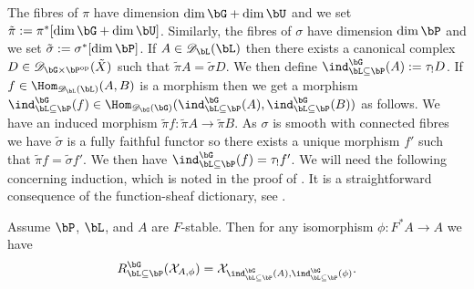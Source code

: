 \documentclass[eqthmnum,nocolour,skinny]{jt-calcs}
\begin{document}
\begin{pa}
The fibres of $\pi$ have dimension $\dim\bG+\dim\bU$ and we set $\tilde{\pi} := \pi^*[\dim\bG+\dim\bU]$. Similarly, the fibres of $\sigma$ have dimension $\dim\bP$ and we set $\tilde{\sigma} := \sigma^*[\dim\bP]$. If $A \in \mathscr{D}_{\bL}(\bL)$ then there exists a canonical complex $D \in \mathscr{D}_{\bG\times\bP^{\mathrm{op}}}(\tilde{X})$ such that $\tilde{\pi}A = \tilde{\sigma}D$. We then define $\ind_{\bL\subseteq\bP}^{\bG}(A) := \tau_!D$. If $f \in \Hom_{\mathscr{D}_{\bL}(\bL)}(A,B)$ is a morphism then we get a morphism $\ind_{\bL\subseteq\bP}^{\bG}(f) \in \Hom_{\mathscr{D}_{\bG}(\bG)}(\ind_{\bL\subseteq\bP}^{\bG}(A),\ind_{\bL\subseteq\bP}^{\bG}(B))$ as follows. We have an induced morphism $\tilde{\pi}f : \tilde{\pi}A \to \tilde{\pi}B$. As $\sigma$ is smooth with connected fibres we have $\widetilde{\sigma}$ is a fully faithful functor so there exists a unique morphism $f'$ such that $\widetilde{\pi}f = \widetilde{\sigma}f'$. We then have $\ind_{\bL\subseteq\bP}^{\bG}(f) = \tau_!f'$. We will need the following concerning induction, which is noted in the proof of \cite[15.2]{lusztig:1985:character-sheaves}. It is a straightforward consequence of the function-sheaf dictionary, see \cite[Thm.~12.1]{kiehl-weissauer:2001:weil-conjectures}.
\end{pa}

\begin{lem}\label{lem:ind-split-Levi}
Assume $\bP$, $\bL$, and $A$ are $F$-stable. Then for any isomorphism $\phi : F^*A \to A$ we have
\begin{equation*}
R_{\bL\subseteq\bP}^{\bG}(\mathcal{X}_{A,\phi}) = \mathcal{X}_{\ind_{\bL\subseteq\bP}^{\bG}(A),\ind_{\bL\subseteq\bP}^{\bG}(\phi)}.
\end{equation*}
\end{lem}
\end{document}
